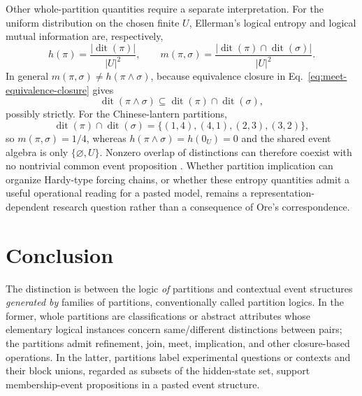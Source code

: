 \documentclass[aps,pra,reprint,nofootinbib]{revtex4-2}
\newcommand{\dit}{\operatorname{dit}}
\begin{document}
Other whole-partition quantities require a separate interpretation.  For the
uniform distribution on the chosen finite $U$, Ellerman's logical entropy and
logical mutual information are, respectively,
\begin{equation}
  h(\pi)=\frac{|\dit(\pi)|}{|U|^2},
  \qquad
  m(\pi,\sigma)
  =\frac{|\dit(\pi)\cap\dit(\sigma)|}{|U|^2}.
  \label{eq:logical-entropy}
\end{equation}
In general $m(\pi,\sigma)\ne h(\pi\wedge\sigma)$, because equivalence closure
in Eq.~\eqref{eq:meet-equivalence-closure} gives
\begin{equation}
  \dit(\pi\wedge\sigma)
  \subseteq\dit(\pi)\cap\dit(\sigma),
  \label{eq:mutual-vs-meet}
\end{equation}
possibly strictly.  For the Chinese-lantern partitions,
\begin{equation}
  \dit(\pi)\cap\dit(\sigma)
  =\{(1,4),(4,1),(2,3),(3,2)\},
\end{equation}
so $m(\pi,\sigma)=1/4$, whereas
$h(\pi\wedge\sigma)=h(0_U)=0$ and the shared event algebra is only
$\{\varnothing,U\}$.  Nonzero overlap of distinctions can therefore coexist
with no nontrivial common event proposition
\cite{ellerman-2014-introduction}.  Whether partition implication can organize
Hardy-type forcing chains, or whether these entropy quantities admit a useful
operational reading for a pasted model, remains a representation-dependent
research question rather than a consequence of Ore's correspondence.

\section{Conclusion}

The distinction is between the logic \emph{of} partitions and contextual event
structures \emph{generated by} families of partitions, conventionally called
partition logics.  In the former, whole partitions are classifications or
abstract attributes whose elementary logical instances concern same/different
distinctions between pairs; the partitions admit refinement, join, meet,
implication, and other closure-based operations.  In the latter, partitions
label experimental questions or contexts and their block unions, regarded as
subsets of the hidden-state set, support membership-event propositions in a
pasted event structure.
\end{document}
